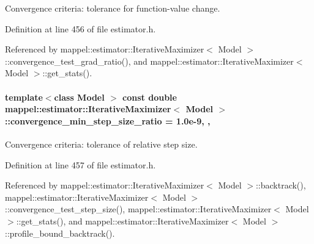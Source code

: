 Convergence criteria\+: tolerance for function-\/value change. 



Definition at line 456 of file estimator.\+h.



Referenced by mappel\+::estimator\+::\+Iterative\+Maximizer$<$ Model $>$\+::convergence\+\_\+test\+\_\+grad\+\_\+ratio(), and mappel\+::estimator\+::\+Iterative\+Maximizer$<$ Model $>$\+::get\+\_\+stats().

\paragraph[{\texorpdfstring{convergence\+\_\+min\+\_\+step\+\_\+size\+\_\+ratio}{convergence_min_step_size_ratio}}]{\setlength{\rightskip}{0pt plus 5cm}template$<$class Model $>$ const double {\bf mappel\+::estimator\+::\+Iterative\+Maximizer}$<$ Model $>$\+::convergence\+\_\+min\+\_\+step\+\_\+size\+\_\+ratio = 1.\+0e-\/9\hspace{0.3cm}{\ttfamily [static]}, {\ttfamily [protected]}, {\ttfamily [inherited]}}\hypertarget{classmappel_1_1estimator_1_1IterativeMaximizer_a4daa3375ddf2e676980a33630c186f92}{}\label{classmappel_1_1estimator_1_1IterativeMaximizer_a4daa3375ddf2e676980a33630c186f92}


Convergence criteria\+: tolerance of relative step size. 



Definition at line 457 of file estimator.\+h.



Referenced by mappel\+::estimator\+::\+Iterative\+Maximizer$<$ Model $>$\+::backtrack(), mappel\+::estimator\+::\+Iterative\+Maximizer$<$ Model $>$\+::convergence\+\_\+test\+\_\+step\+\_\+size(), mappel\+::estimator\+::\+Iterative\+Maximizer$<$ Model $>$\+::get\+\_\+stats(), and mappel\+::estimator\+::\+Iterative\+Maximizer$<$ Model $>$\+::profile\+\_\+bound\+\_\+backtrack().

